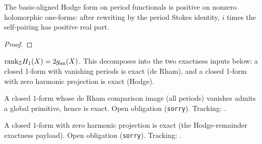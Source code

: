 \begin{lemma}
\label{lem:hodge-form-pos-def-on-periods}
The basis-aligned Hodge form on period functionals is positive on nonzero
holomorphic one-forms: after rewriting by the period Stokes identity,
\(i\) times the self-pairing has positive real part.
\leanok
\end{lemma}
\begin{proof}\leanok\end{proof}


\begin{theorem}
\label{input:hodge-deRham}
\(\mathrm{rank}_{\mathbb{Z}}H_1(X) = 2g_{\mathrm{an}}(X)\). This decomposes into the two
exactness inputs below: a closed 1-form with vanishing periods is exact (de Rham),
and a closed 1-form with zero harmonic projection is exact (Hodge).
\end{theorem}

\begin{lemma}
\label{lem:derham-zero-period-primitive-exists}
A closed \(1\)-form whose de Rham comparison image (all periods) vanishes admits
a global primitive, hence is exact. Open obligation (\lstinline{sorry}).
Tracking: .
\end{lemma}

\begin{lemma}
\label{lem:hodge-remainder-period-payload-exact}
A closed \(1\)-form with zero harmonic projection is exact (the Hodge-remainder
exactness payload). Open obligation (\lstinline{sorry}).
Tracking: .
\end{lemma}
